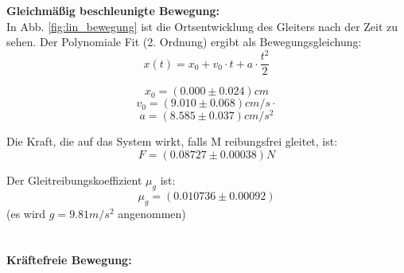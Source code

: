 \documentclass[12pt,a4paper]{article}
\begin{document}
\begin{multicols}{2}

\noindent \textbf{Gleichmäßig beschleunigte Bewegung:}\\

In Abb. \ref{fig:lin_bewegung} ist die Ortsentwicklung des Gleiters nach der Zeit zu sehen.
Der Polynomiale Fit (2. Ordnung) ergibt als Bewegungsgleichung:
$$x(t)=x_0 + v_0 \cdot t + a \cdot \frac{t^2}{2}$$

$$x_0=(0.000 \pm 0.024)cm$$
$$v_0=(9.010 \pm 0.068)cm/s \cdot $$
$$a=( 8.585 \pm 0.037) cm/s^2 $$

Die Kraft, die auf das System wirkt, falls M reibungsfrei gleitet, ist:
$$F= (0.08727 \pm 0.00038) N$$

Der Gleitreibungskoeffizient $\mu_g$ ist:
$$\mu_g = (0.010736 \pm 0.00092)$$
(es wird $g=9.81m/s^2$ angenommen)\\
\\
\\


\noindent \textbf{Kräftefreie Bewegung:}\\



\end{multicols}
\end{document}
